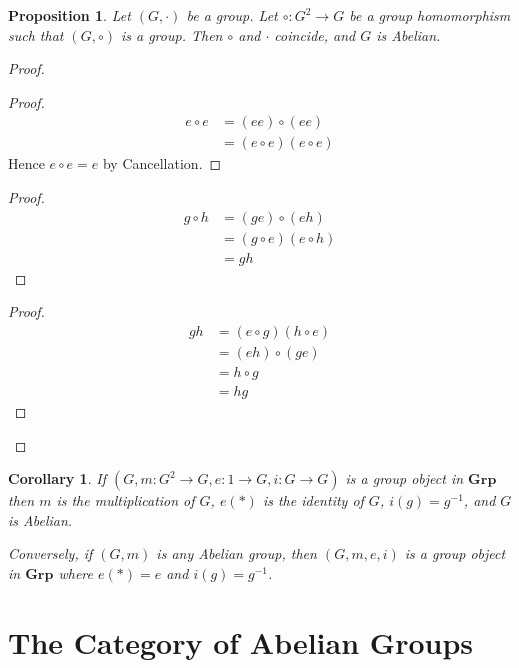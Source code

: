 \documentclass{book}
\let\qed\relax
\newtheorem{prop}{Proposition}[chapter]
\newtheorem{cor}{Corollary}[prop]
\theoremstyle{definition}
\newcommand{\Grp}{\ensuremath{\mathbf{Grp}}}
\newcommand{\inv}[1]{\ensuremath{{#1}^{-1}}}
\begin{document}
\begin{prop}
Let $(G,\cdot)$ be a group. Let $\circ : G^2 \rightarrow G$ be a group homomorphism such that $(G,\circ)$ is a group. Then $\circ$ and $\cdot$ coincide, and $G$ is Abelian.
\end{prop}

\begin{proof}
\pf
{}
\begin{proof}
\pf
\begin{align*}
e \circ e & = (ee) \circ (ee) \\
& = (e \circ e) (e \circ e)
\end{align*}
Hence $e \circ e = e$ by Cancellation.
\end{proof}
\begin{proof}
\pf
\begin{align*}
g \circ h & = (ge) \circ (eh) \\
& = (g \circ e)(e \circ h) \\
& = gh
\end{align*}
\end{proof}
\begin{proof}
\pf
\begin{align*}
gh & = (e \circ g)(h \circ e) \\
& = (eh) \circ (ge) \\
& = h \circ g \\
& = hg
\end{align*}
\end{proof}
\qed
\end{proof}

\begin{cor}
\label{cor:group-in-group}
If $(G, m : G^2 \rightarrow G, e : 1 \rightarrow G, i : G \rightarrow G)$ is a group object in $\Grp$ then $m$ is the multiplication of $G$, $e(*)$ is the identity of $G$, $i(g) = \inv{g}$, and $G$ is Abelian.

Conversely, if $(G, m)$ is any Abelian group, then $(G,m,e,i)$ is a group object in $\Grp$ where $e(*) = e$ and $i(g) = \inv{g}$.
\end{cor}

\section{The Category of Abelian Groups}
\end{document}
